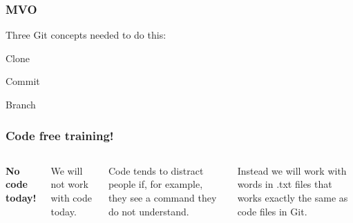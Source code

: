 \documentclass[aspectratio=169]{beamer} %
\begin{document}
\begin{frame}
\frametitle{MVO}

	\hspace*{2.5cm}\Large{Three Git concepts needed to do this:}

	\begin{itemize}
		\setlength{\itemindent}{3cm}
		\Large{\item Clone}
		\Large{\item Commit}
		\Large{\item Branch}
	\end{itemize}

\end{frame}


\begin{frame}
\frametitle{Code free training!}

	\begin{columns}[c]


		\textbf{No code today!}

		\vspace{.5cm}

		We will not work with code today.

		\vspace{.25cm}

		Code tends to distract people if, for example, they see a command they do not understand.

		\vspace{.25cm}

		Instead we will work with words in .txt files that works exactly the same as code files in Git.


	\end{columns}
\end{frame}
\end{document}
